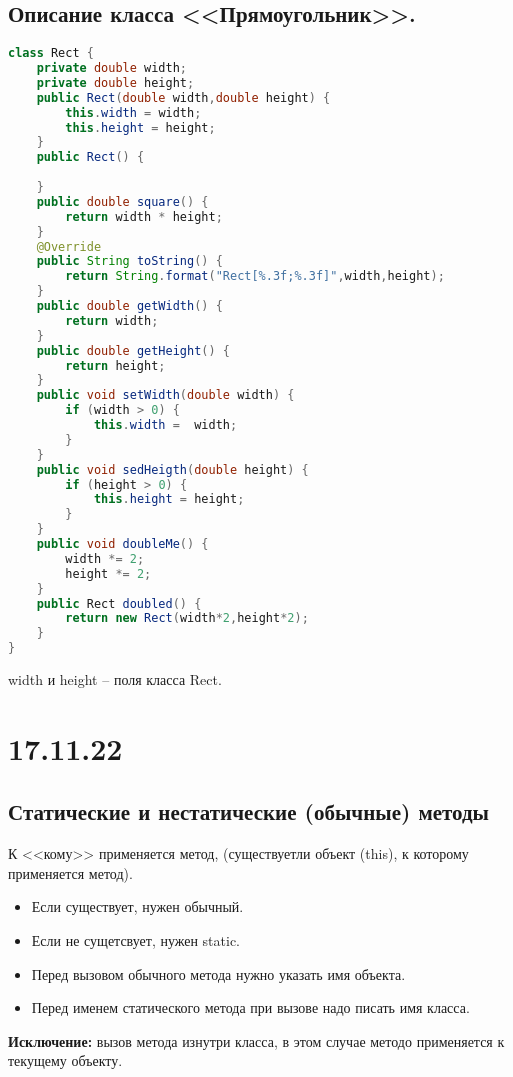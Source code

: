 \documentclass{scrartcl}
\begin{document}
\subsection{Описание класса <<Прямоугольник>>.}
\begin{lstlisting}[language=Java] 
class Rect {
    private double width;
    private double height;
    public Rect(double width,double height) {
        this.width = width;
        this.height = height;
    }
    public Rect() {
        
    }
    public double square() {
        return width * height;
    }
    @Override
    public String toString() {
        return String.format("Rect[%.3f;%.3f]",width,height);
    }
    public double getWidth() {
        return width;
    }
    public double getHeight() {
        return height;
    }
    public void setWidth(double width) {
        if (width > 0) {
            this.width =  width;
        }
    }
    public void sedHeigth(double height) {
        if (height > 0) {
            this.height = height;
        }
    }
    public void doubleMe() {
        width *= 2;
        height *= 2;
    }
    public Rect doubled() {
        return new Rect(width*2,height*2);
    }
} 
\end{lstlisting} 
width и height --  поля класса Rect.
\section{17.11.22}
\subsection{Статические и нестатические (обычные) методы}
К <<кому>> применяется метод, (существуетли объект (this), к которому применяется метод).
\begin{itemize}
    \item Если существует, нужен обычный.
    \item Если  не сущетсвует, нужен static.
\end{itemize}
\begin{itemize}
    \item Перед вызовом обычного метода нужно указать имя объекта. 
    \item Перед именем статического метода при вызове надо писать имя класса.
\end{itemize}

\textbf{Исключение: } вызов метода изнутри класса, в этом случае методо применяется к текущему объекту.
\end{document}
